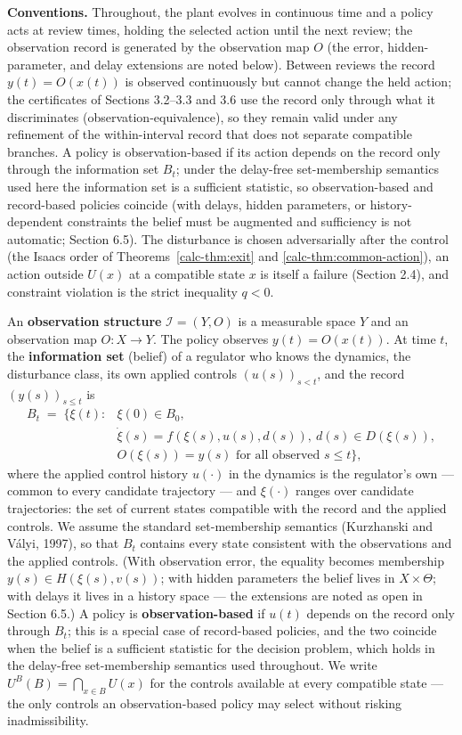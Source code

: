 \documentclass[10pt,twocolumn]{article}
\theoremstyle{definition}
\begin{document}
\textbf{Conventions.} Throughout, the plant evolves in continuous time
and a policy acts at review times, holding the selected action until the
next review; the observation record is generated by the observation map
\(O\) (the error, hidden-parameter, and delay extensions are noted
below). Between reviews the record \(y(t)=O(x(t))\) is observed
continuously but cannot change the held action; the certificates of
Sections 3.2--3.3 and 3.6 use the record only through what it discriminates
(observation-equivalence), so they remain valid under any refinement of
the within-interval record that does not separate compatible branches.
A policy is observation-based if its action depends on the
record only through the information set \(B_t\); under the delay-free
set-membership semantics used here the information set is a sufficient
statistic, so observation-based and record-based policies coincide (with
delays, hidden parameters, or history-dependent constraints the belief
must be augmented and sufficiency is not automatic; Section 6.5). The disturbance
is chosen adversarially after the control (the Isaacs order of
Theorems~\ref{calc-thm:exit} and \ref{calc-thm:common-action}), an action outside
\(U(x)\) at a compatible state \(x\) is itself a failure (Section 2.4),
and constraint violation is the strict inequality \(q<0\).

An \textbf{observation structure} \(\mathcal{I} = (Y, O)\) is a
measurable space \(Y\) and an observation map \(O : X \to Y\). The
policy observes \(y(t) = O(x(t))\). At time \(t\), the
\textbf{information set} (belief) of a regulator who knows the dynamics,
the disturbance class, its own applied controls \((u(s))_{s<t}\), and the record \((y(s))_{s \le t}\) is
\[
\begin{aligned}
B_t \;=\; \bigl\{ \xi(t) : {}& \xi(0) \in B_0,\\
& \dot\xi(s) = f(\xi(s), u(s), d(s)),\ d(s) \in D(\xi(s)),\\
& O(\xi(s)) = y(s) \text{ for all observed } s \le t \bigr\},
\end{aligned}
\]
where the applied control history \(u(\cdot)\) in the dynamics is
the regulator's own --- common to every candidate trajectory --- and
\(\xi(\cdot)\) ranges over candidate trajectories: the set of current
states compatible with the record and the applied controls. We assume the standard set-membership semantics (Kurzhanski and V\'alyi, 1997), so that \(B_t\) contains every state
consistent with the observations and the applied controls. (With
observation error, the equality becomes membership
\(y(s) \in H(\xi(s), v(s))\); with hidden parameters the belief lives in
\(X \times \Theta\); with delays it lives in a history space --- the extensions are noted as open in Section 6.5.) A policy is
\textbf{observation-based} if \(u(t)\) depends on the record only
through \(B_t\); this is a special case of record-based policies, and
the two coincide when the belief is a sufficient statistic for the
decision problem, which holds in the delay-free set-membership semantics used
throughout. We write \(U^B(B) = \bigcap_{x \in B} U(x)\) for the
controls available at every compatible state --- the only controls an
observation-based policy may select without risking inadmissibility.
\end{document}

